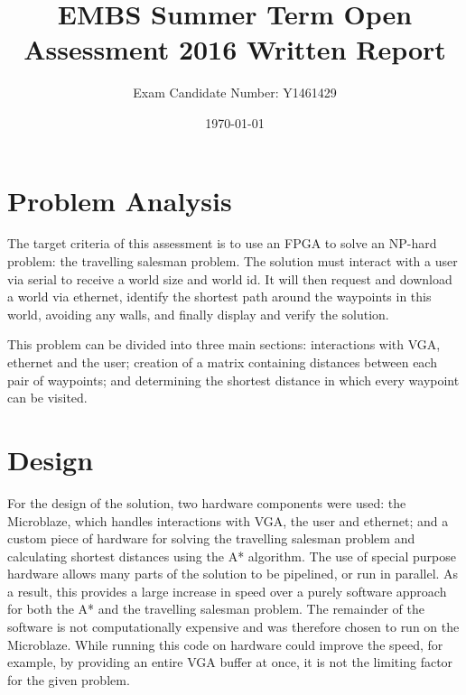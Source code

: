 \documentclass[a4paper, 11pt]{article}
\title{EMBS Summer Term Open Assessment 2016 Written Report}
\author{Exam Candidate Number: Y1461429}
\date{\today}
\begin{document}
\maketitle
\section{Problem Analysis} %
The target criteria of this assessment is to use an FPGA to solve an NP-hard 
problem: the travelling salesman problem. The solution must interact with a user 
via serial to receive a world size and world id. It will then
request and download a world via ethernet, identify the shortest path around the 
waypoints in this world, avoiding any walls, and finally display and verify the solution. 
\par\bigskip\noindent
This problem can be divided into three main sections: interactions with VGA, ethernet
and the user; creation of a matrix containing distances between each pair of waypoints;
and determining the shortest distance in which every waypoint can be visited.

\section{Design} %
For the design of the solution, two hardware components were used: the Microblaze, 
which handles interactions with VGA, the user and ethernet; 
and a custom piece of hardware for solving the travelling salesman problem and 
calculating shortest distances using the A* algorithm. The use of special purpose 
hardware allows many parts of the solution to be pipelined, or run in parallel. 
As a result, this provides a large increase in speed over a purely software approach 
for both the A* and the travelling salesman problem. The remainder of the software 
is not computationally expensive and was therefore chosen to run on the
Microblaze. While running this code on hardware could improve the speed, for example, by 
providing an entire VGA buffer at once, it is not the limiting factor for the 
given problem.
\end{document}
